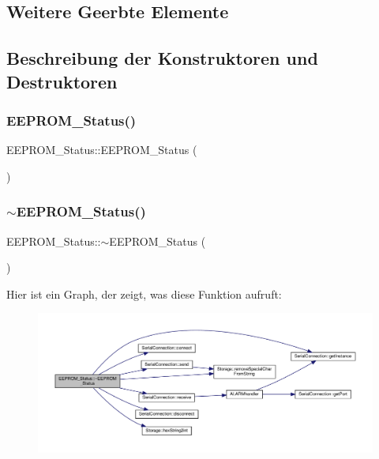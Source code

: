 \subsection*{Weitere Geerbte Elemente}


\subsection{Beschreibung der Konstruktoren und Destruktoren}
\mbox{\label{class_e_e_p_r_o_m___status_ae5c247f1cba8c2409b9dbdb871c96b7b}} 
\subsubsection{E\+E\+P\+R\+O\+M\+\_\+\+Status()}
{\footnotesize\ttfamily E\+E\+P\+R\+O\+M\+\_\+\+Status\+::\+E\+E\+P\+R\+O\+M\+\_\+\+Status (\begin{DoxyParamCaption}{ }\end{DoxyParamCaption})}

\mbox{\label{class_e_e_p_r_o_m___status_a34a18e592fa670a1b92f98eb1a70c408}} 
\subsubsection{$\sim$\+E\+E\+P\+R\+O\+M\+\_\+\+Status()}
{\footnotesize\ttfamily E\+E\+P\+R\+O\+M\+\_\+\+Status\+::$\sim$\+E\+E\+P\+R\+O\+M\+\_\+\+Status (\begin{DoxyParamCaption}{ }\end{DoxyParamCaption})\hspace{0.3cm}{\ttfamily [virtual]}}

Hier ist ein Graph, der zeigt, was diese Funktion aufruft\+:
\nopagebreak
\begin{figure}[H]
\begin{center}
\leavevmode
\includegraphics[width=350pt]{class_e_e_p_r_o_m___status_a34a18e592fa670a1b92f98eb1a70c408_cgraph}
\end{center}
\end{figure}


